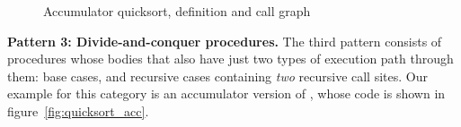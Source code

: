 \begin{figure}[tb]
\begin{center}
\begin{minipage}[b][1.9in]{0.49\textwidth}
\hfill
\end{minipage}
\begin{minipage}[b][1.9in]{0.49\textwidth}
\hfill
\end{minipage}
\end{center}
\vspace{-2ex}
\caption{Accumulator quicksort, definition and call graph}
\end{figure}

{\bf Pattern 3: Divide-and-conquer procedures.}
The third pattern consists of procedures whose bodies
that also have just two types of execution path through them:
base cases, and recursive cases containing \emph{two} recursive call sites.
Our example for this category is an accumulator version of \quicksortacc,
whose code is shown in figure~\ref{fig:quicksort_acc}.

